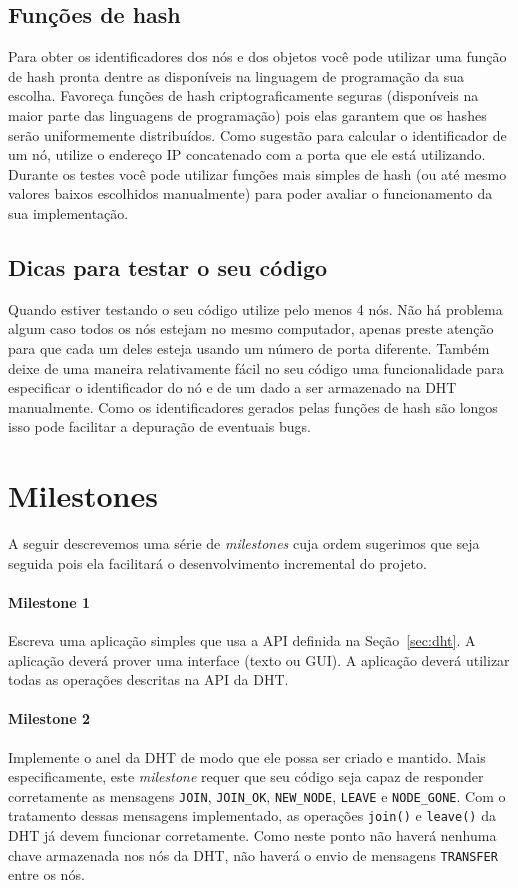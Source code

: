 \documentclass[oneside,12pt,a4paper]{article}
\begin{document}
\subsection{Funções de hash}

Para obter os identificadores dos nós e dos objetos você pode utilizar
uma função de hash pronta dentre as disponíveis na linguagem de
programação da sua escolha. Favoreça funções de hash
criptograficamente seguras (disponíveis na maior parte das linguagens
de programação) pois elas garantem que os hashes serão uniformemente
distribuídos. Como sugestão para calcular o identificador de um nó,
utilize o endereço IP concatenado com a porta que ele está
utilizando. Durante os testes você pode utilizar funções mais simples
de hash (ou até mesmo valores baixos escolhidos manualmente) para
poder avaliar o funcionamento da sua implementação.


\subsection{Dicas para testar o seu código}

Quando estiver testando o seu código utilize pelo menos 4 nós. Não há
problema algum caso todos os nós estejam no mesmo computador, apenas
preste atenção para que cada um deles esteja usando um número de porta
diferente. Também deixe de uma maneira relativamente fácil no seu
código uma funcionalidade para especificar o identificador do nó e de
um dado a ser armazenado na DHT manualmente. Como os identificadores
gerados pelas funções de hash são longos isso pode facilitar a
depuração de eventuais bugs.

\section{Milestones}

A seguir descrevemos uma série de \emph{milestones} cuja ordem
sugerimos que seja seguida pois ela facilitará o desenvolvimento
incremental do projeto.

\paragraph{Milestone 1}
Escreva uma aplicação simples que usa a API definida na
Seção~\ref{sec:dht}. A aplicação deverá prover uma interface (texto ou
GUI). A aplicação deverá utilizar todas as operações descritas na API
da DHT.

\paragraph{Milestone 2}
Implemente o anel da DHT de modo que ele possa ser criado e
mantido. Mais especificamente, este \emph{milestone} requer que seu
código seja capaz de responder corretamente as mensagens
\texttt{JOIN}, \texttt{JOIN\_OK}, \texttt{NEW\_NODE}, \texttt{LEAVE} e
\texttt{NODE\_GONE}. Com o tratamento dessas mensagens implementado, as
operações \texttt{join()} e \texttt{leave()} da DHT já devem funcionar
corretamente. Como neste ponto não haverá nenhuma chave armazenada nos
nós da DHT, não haverá o envio de mensagens \texttt{TRANSFER} entre os
nós.
\end{document}
